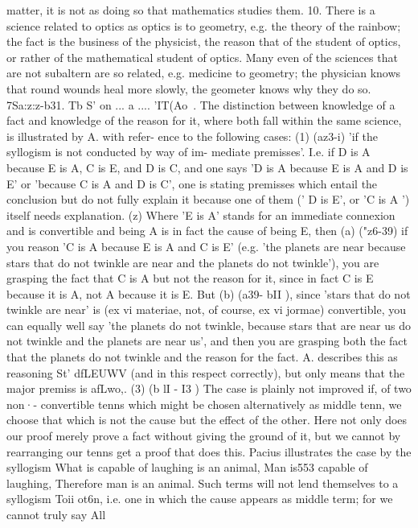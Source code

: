 {{{{{{{{{{{{{matter, it is not as doing so that mathematics studies them.
10. There is a science related to optics as optics is to geometry,
e.g. the theory of the rainbow; the fact is the business of the
physicist, the reason that of the student of optics, or rather of
the mathematical student of optics. Many even of the sciences
that are not subaltern are so related, e.g. medicine to geometry;
the physician knows that round wounds heal more slowly, the
geometer knows why they do so.
7Sa:z:z-b31. Tb S' on ... a .... 'IT(Ao~. The distinction between
knowledge of a fact and knowledge of the reason for it, where
both fall within the same science, is illustrated by A. with refer-
ence to the following cases:
(1) (az3-{i) 'if the syllogism is not conducted by way of im-
mediate premisses'. I.e. if D is A because E is A, C is E, and
D is C, and one says 'D is A because E is A and D is E' or
'because C is A and D is C', one is stating premisses which entail
the conclusion but do not fully explain it because one of them
(' D is E', or 'C is A ') itself needs explanation.
(z) Where 'E is A' stands for an immediate connexion and is
convertible and being A is in fact the cause of being E, then (a)
("z6-39) if you reason 'C is A because E is A and C is E' (e.g. 'the
planets are near because stars that do not twinkle are near and
the planets do not twinkle'), you are grasping the fact that C is A
but not the reason for it, since in fact C is E because it is A, not
A because it is E. But (b) (a39- bII ), since 'stars that do not
twinkle are near' is (ex vi materiae, not, of course, ex vi jormae)
convertible, you can equally well say 'the planets do not twinkle,
because stars that are near us do not twinkle and the planets
are near us', and then you are grasping both the fact that the
planets do not twinkle and the reason for the fact.
A. describes this as reasoning St' dfLEUWV (and in this respect
correctly), but only means that the major premiss is afLwo,.
(3) (b lI - I3 ) The case is plainly not improved if, of two non·-
convertible tenns which might be chosen alternatively as middle
tenn, we choose that which is not the cause but the effect of the
other. Here not only does our proof merely prove a fact without
giving the ground of it, but we cannot by rearranging our tenns
get a proof that does this. Pacius illustrates the case by the
syllogism What is capable of laughing is an animal, Man is553
capable of laughing, Therefore man is an animal. Such terms
will not lend themselves to a syllogism Toii ot6n, i.e. one in which
the cause appears as middle term; for we cannot truly say All
}}}}}}}}}}}}}}
